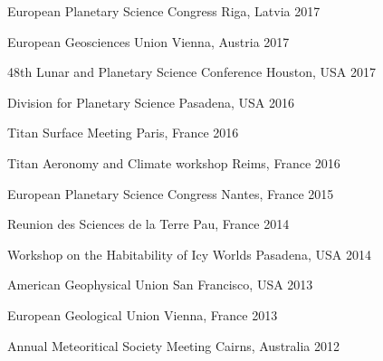 
\begin{cvhonors}

  \cvhonor
    {European Planetary Science Congress}
    {}
    {Riga, Latvia}
    {2017}

  \cvhonor
    {European Geosciences Union}
    {}
    {Vienna, Austria}
    {2017}

  \cvhonor
    {48th Lunar and Planetary Science Conference}
    {}
    {Houston, USA}
    {2017}

  \cvhonor
    {Division for Planetary Science}
    {}
    {Pasadena, USA}
    {2016}

  \cvhonor
    {Titan Surface Meeting}
    {}
    {Paris, France}
    {2016}

  \cvhonor
    {Titan Aeronomy and Climate workshop}
    {}
    {Reims, France}
    {2016}

  \cvhonor
    {European Planetary Science Congress}
    {}
    {Nantes, France}
    {2015}

  \cvhonor
    {Reunion des Sciences de la Terre}
    {}
    {Pau, France}
    {2014}

  \cvhonor
    {Workshop on the Habitability of Icy Worlds}
    {}
    {Pasadena, USA}
    {2014}

  \cvhonor
    {American Geophysical Union}
    {}
    {San Francisco, USA}
    {2013}

  \cvhonor
    {European Geological Union}
    {}
    {Vienna, France}
    {2013}

  \cvhonor
    {Annual Meteoritical Society Meeting}
    {}
    {Cairns, Australia}
    {2012}


\end{cvhonors}
